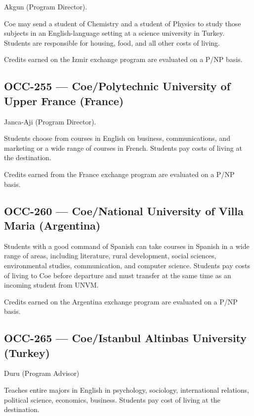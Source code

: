 \documentclass[
  letterpaper,
]{scrbook}
\begin{document}
Akgun (Program Director).

Coe may send a student of Chemistry and a student of Physics to study
those subjects in an English-language setting at a science university in
Turkey. Students are responsible for housing, food, and all other costs
of living.

Credits earned on the Izmir exchange program are evaluated on a P/NP
basis.

\subsection{OCC-255 --- Coe/Polytechnic University of Upper France
(France)}\label{occ-255-coepolytechnic-university-of-upper-france-france}

Janca-Aji (Program Director).

Students choose from courses in English on business, communications, and
marketing or a wide range of courses in French. Students pay costs of
living at the destination.

Credits earned from the France exchange program are evaluated on a P/NP
basis.

\subsection{OCC-260 --- Coe/National University of Villa Maria
(Argentina)}\label{occ-260-coenational-university-of-villa-maria-argentina}

Students with a good command of Spanish can take courses in Spanish in a
wide range of areas, including literature, rural development, social
sciences, environmental studies, communication, and computer science.
Students pay costs of living to Coe before departure and must transfer
at the same time as an incoming student from UNVM.

Credits earned on the Argentina exchange program are evaluated on a P/NP
basis.

\subsection{OCC-265 --- Coe/Istanbul Altinbas University
(Turkey)}\label{occ-265-coeistanbul-altinbas-university-turkey}

Duru (Program Advisor)

Teaches entire majors in English in psychology, sociology, international
relations, political science, economics, business. Students pay cost of
living at the destination.
\end{document}
